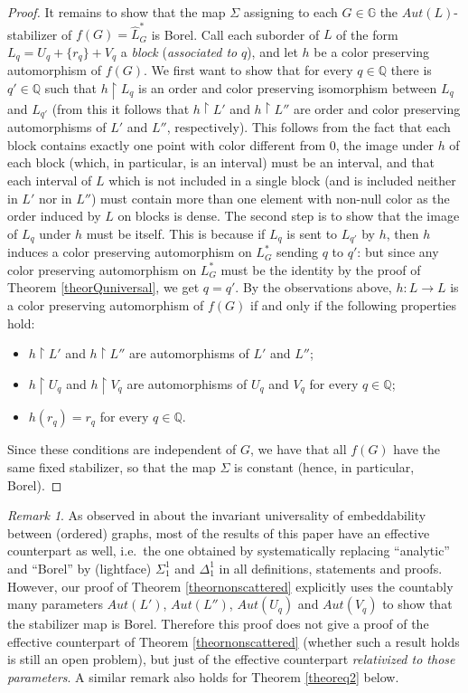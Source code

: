 \documentclass{amsart}
\theoremstyle{definition}
\theoremstyle{remark}
\newtheorem{remark}[theorem]{Remark}
\begin{document}
\begin{proof}
It remains to show that the map $\Sigma$
assigning to each $G \in {\mathbb{G}}$ the $Aut(L)$-stabilizer of $f(G) =
\hat{L}^*_G$ is
Borel. Call each suborder of $L$ of the form $L_q = U_q + \{ r_q \} + V_q$ a
\emph{block} (\emph{associated to} $q$), and let $h$ be a color
preserving automorphism
of $f(G)$. We first want to show that for every $q \in {\mathbb{Q}}$ there is $q'
\in {\mathbb{Q}}$ such that $h \restriction L_q$ is an order and color
preserving isomorphism between $L_q$ and $L_{q'}$ (from this it follows
that $h \restriction L'$ and $h \restriction L''$ are order and color
preserving automorphisms of $L'$ and $L''$, respectively). This follows from
the fact that each block contains exactly one point with color
different from $0$, the image under $h$ of each block (which, in particular, is
an interval) must be an interval, and that each interval of $L$ which
is not included in a single block (and is included neither in $L'$
nor in $L''$) must contain more than one element with non-null color
as the order induced by $L$ on blocks is dense. The second step is to
show that the image of $L_q$ under $h$ must be itself. This is because
if $L_q$ is sent to $L_{q'}$ by $h$, then $h$ induces a color
preserving
automorphism on $L^*_G$ sending $q$ to $q'$: but since any
color preserving automorphism on $L^*_G$ must be the identity by the proof of
Theorem \ref{theorQuniversal}, we get $q=q'$. By the observations
above, $h \colon L\to L$ is a color preserving automorphism of $f(G)$
if and only  if the
following properties hold:
\begin{itemize}
\item $h \restriction L'$ and $h \restriction L''$ are
  automorphisms of $L'$ and $L''$;
\item $h \restriction U_q$ and $h \restriction V_q$ are
  automorphisms of $U_q$ and $V_q$ for every $q \in {\mathbb{Q}}$;
\item $h(r_q) = r_q$ for every $q \in {\mathbb{Q}}$.
\end{itemize}
Since these conditions are independent of $G$, we have that
all $f(G)$ have the same fixed stabilizer, so that the map $\Sigma$
 is constant (hence,
in particular, Borel).
\end{proof}

\begin{remark}
As observed in \cite{FriMot} about the invariant universality of
embeddability between (ordered) graphs, most of the results of this
paper have an effective counterpart as well, i.e.\ the one obtained by
systematically replacing ``analytic'' and ``Borel'' by (lightface)
$\Sigma^1_1$ and $\Delta^1_1$ in all definitions, statements and
proofs. However, our proof  of Theorem \ref{theornonscattered}
explicitly uses the countably many parameters $Aut(L')$, $Aut(L'')$,
$Aut(U_q)$ and $Aut(V_q)$ to show that the stabilizer map is Borel.
Therefore this proof does not give a proof of the effective counterpart
of Theorem \ref{theornonscattered} (whether such a result holds is
still an open problem), but just of the effective counterpart
\emph{relativized to those parameters}. A similar remark also holds for
Theorem \ref{theoreq2} below.
\end{remark}
\end{document}
